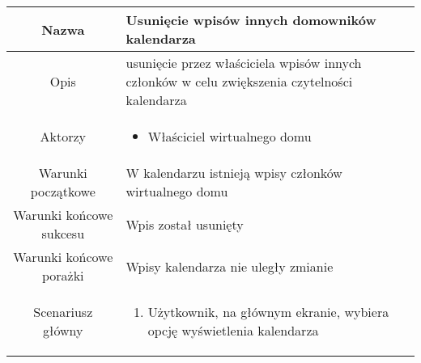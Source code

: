 \documentclass{article}
\begin{document}
\begin{enumerate}
\begin{enumerate}
				\begin{table}[H]
					\centering
					\begin{tabular}{|c|p{7cm}|}
						\hline
						Nazwa                   & \textbf{Usunięcie wpisów innych domowników kalendarza}                                                                                                                                                                                                                                                                                 \\
						\hline
						Opis                    & usunięcie przez właściciela wpisów innych członków w celu zwiększenia czytelności kalendarza                                                                                                                                                                                                                                           \\
						\hline
						Aktorzy                 & \begin{itemize}\item Właściciel wirtualnego domu\end{itemize}                                                                                                                                                                                                                                                                          \\
						\hline
						Warunki początkowe      & W kalendarzu istnieją wpisy członków wirtualnego domu                                                                                                                                                                                                                                                                                  \\
						\hline
						Warunki końcowe sukcesu & Wpis został usunięty                                                                                                                                                                                                                                                                                                                   \\
						\hline
						Warunki końcowe porażki & Wpisy kalendarza nie uległy zmianie                                                                                                                                                                                                                                                                                                    \\
						\hline
						Scenariusz główny       & \begin{enumerate}\item Użytkownik, na głównym ekranie, wybiera opcję wyświetlenia kalendarza


\end{enumerate}
\end{tabular}
\end{table}
\end{enumerate}
\end{enumerate}
\end{document}
